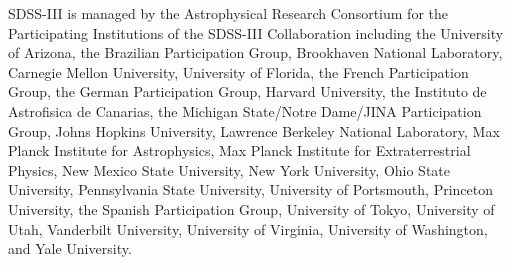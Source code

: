 \documentclass[fleqn,usenatbib]{mnras}
\begin{document}
SDSS-III is managed by the Astrophysical Research Consortium for the
Participating Institutions of the SDSS-III Collaboration including the
University of Arizona, the Brazilian Participation Group, Brookhaven National
Laboratory, Carnegie Mellon University, University of Florida, the French
Participation Group, the German Participation Group, Harvard University, the
Instituto de Astrofisica de Canarias, the Michigan State/Notre Dame/JINA
Participation Group, Johns Hopkins University, Lawrence Berkeley National
Laboratory, Max Planck Institute for Astrophysics, Max Planck Institute for
Extraterrestrial Physics, New Mexico State University, New York University,
Ohio State University, Pennsylvania State University, University of Portsmouth,
Princeton University, the Spanish Participation Group, University of Tokyo,
University of Utah, Vanderbilt University, University of Virginia, University
of Washington, and Yale University.

\footnotesize{


}

\bsp	%
\label{lastpage}
\end{document}
